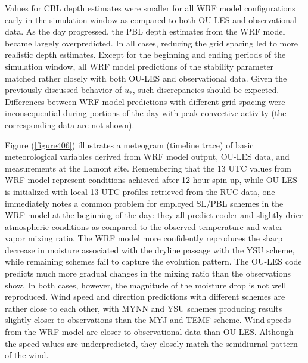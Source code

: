 Values for CBL depth estimates were smaller for all WRF model configurations early in the simulation window as compared to both OU-LES and observational data. As the day progressed, the PBL depth estimates from the WRF model became largely overpredicted. In all cases, reducing the grid spacing led to more realistic depth estimates. Except for the beginning and ending periods of the simulation window, all WRF model predictions of the stability parameter matched rather closely with both OU-LES and observational data. Given the previously discussed behavior of $u_*$, such discrepancies should be expected. Differences between WRF model predictions with different grid spacing were inconsequential during portions of the day with peak convective activity (the corresponding data are not shown). 

Figure (\autoref{figure406}) illustrates a meteogram (timeline trace) of basic meteorological variables derived from WRF model output, OU-LES data, and measurements at the Lamont site. Remembering that the 13 UTC values from WRF model represent conditions achieved after 12-hour spin-up, while OU-LES is initialized with local 13 UTC profiles retrieved from the RUC data, one immediately notes a common problem for employed SL\slash PBL schemes in the WRF model at the beginning of the day: they all predict cooler and slightly drier atmospheric conditions as compared to the observed temperature and water vapor mixing ratio. The WRF model more confidently reproduces the sharp decrease in moisture associated with the dryline passage with the YSU scheme, while remaining schemes fail to capture the evolution pattern. The OU-LES code predicts much more gradual changes in the mixing ratio than the observations show. In both cases, however, the magnitude of the moisture drop is not well reproduced. Wind speed and direction predictions with different schemes are rather close to each other, with MYNN and YSU schemes producing results slightly closer to observations than the MYJ and TEMF scheme. Wind speeds from the WRF model are closer to observational data than OU-LES. Although the speed values are underpredicted, they closely match the semidiurnal pattern of the wind. 


